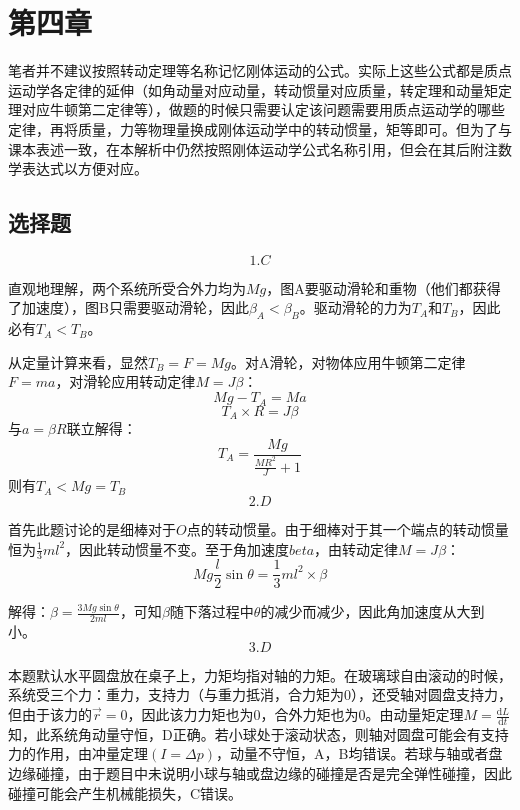\documentclass[b5paper,opensource]{./template/qyxf-book}
\newcommand{\di}[1]{\mathrm{d}#1}
\newcommand{\dy}[2]{\frac{\di{#1}}{\di{#2}}}
\begin{document}
\chapter{第四章}
\begin{note}
	\noindent 笔者并不建议按照转动定理等名称记忆刚体运动的公式。实际上这些公式都是质点运动学各定律的延伸（如角动量对应动量，转动惯量对应质量，转定理和动量矩定理对应牛顿第二定律等），做题的时候只需要认定该问题需要用质点运动学的哪些定律，再将质量，力等物理量换成刚体运动学中的转动惯量，矩等即可。但为了与课本表述一致，在本解析中仍然按照刚体运动学公式名称引用，但会在其后附注数学表达式以方便对应。
\end{note}
	\section{选择题}
		\[1.C\]\par
		直观地理解，两个系统所受合外力均为$ Mg $，图A要驱动滑轮和重物（他们都获得了加速度），图B只需要驱动滑轮，因此$ \beta_A<\beta_B $。驱动滑轮的力为$ T_A $和$ T_B $，因此必有$ T_A<T_B $。\par
		从定量计算来看，显然$ T_B=F=Mg $。对A滑轮，对物体应用牛顿第二定律$F=ma$，对滑轮应用转动定律$M=J\beta$：
		\[Mg-T_A=Ma\]
		\[T_A\times R=J\beta\]
		与$ a=\beta R $联立解得：
		\[T_A=\frac{Mg}{\frac{MR^2}{J}+1}\]
		则有$ T_A< Mg=T_B$
		\[2.D\]\par
		\par
		首先此题讨论的是细棒对于$ O $点的转动惯量。由于细棒对于其一个端点的转动惯量恒为$ \frac{1}{3}ml^2 $，因此转动惯量不变。至于角加速度$ beta $，由转动定律$M=J\beta$：
		\[Mg\frac{l}{2}\sin\theta=\frac{1}{3}ml^2\times\beta\]\par
		解得：$ \beta=\frac{3Mg\sin\theta}{2ml} $，可知$ \beta $随下落过程中$ \theta $的减少而减少，因此角加速度从大到小。
		\[3.D\]\par
		本题默认水平圆盘放在桌子上，力矩均指对轴的力矩。在玻璃球自由滚动的时候，系统受三个力：重力，支持力（与重力抵消，合力矩为0），还受轴对圆盘支持力，但由于该力的$ \vec{r}=0 $，因此该力力矩也为0，合外力矩也为0。由动量矩定理$ M=\dy{L}{t}$ 知，此系统角动量守恒，D正确。若小球处于滚动状态，则轴对圆盘可能会有支持力的作用，由冲量定理$ (I=\Delta p) $，动量不守恒，A，B均错误。若球与轴或者盘边缘碰撞，由于题目中未说明小球与轴或盘边缘的碰撞是否是完全弹性碰撞，因此碰撞可能会产生机械能损失，C错误。
\end{document}
